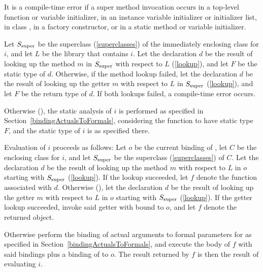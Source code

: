 \documentclass[makeidx]{article}
\begin{document}
\LMHash{}%
It is a compile-time error if a super method invocation occurs in a top-level function or variable initializer,
in an instance variable initializer or initializer list,
in class ,
in a factory constructor,
or in a static method or variable initializer.

{ %

\def\SuperClass{\ensuremath{S_{\mbox{\scriptsize{}super}}}}

\LMHash{}%
Let \SuperClass{} be the superclass (\ref{superclasses})
of the immediately enclosing class for $i$,
and let $L$ be the library that contains $i$.
Let the declaration $d$ be
the result of looking up the method $m$ in \SuperClass{}
with respect to $L$ (\ref{lookup}),
and let $F$ be the static type of $d$.
Otherwise, if the method lookup failed,
let the declaration $d$ be the result of looking up
the getter $m$ with respect to $L$ in \SuperClass{}
(\ref{lookup}),
and let $F$ be the return type of $d$.
If both lookups failed, a compile-time error occurs.

\LMHash{}%
Otherwise (),
the static analysis of $i$ is performed as specified in Section~\ref{bindingActualsToFormals},
considering the function to have static type $F$,
and the static type of $i$ is as specified there.


\LMHash{}%
Evaluation of $i$ proceeds as follows:
Let $o$ be the current binding of \THIS{},
let $C$ be the enclosing class for $i$,
and let \SuperClass{} be the superclass (\ref{superclasses}) of $C$.
Let the declaration $d$ be the result of looking up
the method $m$ with respect to $L$ in $o$ starting with \SuperClass{}
(\ref{lookup}).
If the lookup succeeded,
let $f$ denote the function associated with $d$.
%
Otherwise (),
let the declaration $d$ be the result of looking up
the getter $m$ with respect to $L$ in $o$ starting with \SuperClass{}
(\ref{lookup}).
If the getter lookup succeeded,
invoke said getter with \THIS{} bound to $o$,
and let $f$ denote the returned object.


\LMHash{}%
Otherwise perform the binding of actual arguments to formal parameters for
as specified in Section~\ref{bindingActualsToFormals},
and execute the body of $f$ with said bindings
plus a binding of \THIS{} to $o$.
The result returned by $f$ is then the result of evaluating $i$.

} %
\end{document}
